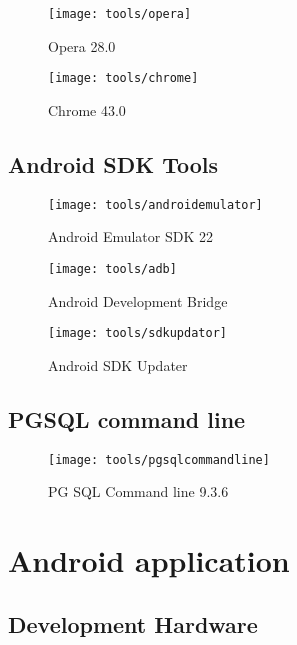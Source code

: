 \begin{figure}[p]
    \centering
    \texttt{[image: tools/opera]}
    \caption{Opera 28.0}
    \label{fig:opera_image}
\end{figure}

\begin{figure}[p]
    \centering
    \texttt{[image: tools/chrome]}
    \caption{Chrome 43.0}
    \label{fig:opera_image}
\end{figure}

\subsection*{Android SDK Tools}

\begin{figure}[p]
    \centering
    \texttt{[image: tools/androidemulator]}
    \caption{Android Emulator SDK 22}
    \label{fig:android_emulator}
\end{figure}

\begin{figure}[p]
    \centering
    \texttt{[image: tools/adb]}
    \caption{Android Development Bridge}
    \label{fig:adb_image}
\end{figure}

\begin{figure}[p]
    \centering
    \texttt{[image: tools/sdkupdator]}
    \caption{Android SDK Updater}
    \label{fig:sdk_updator}
\end{figure}


\subsection*{PGSQL command line}

\begin{figure}[p]
    \centering
    \texttt{[image: tools/pgsqlcommandline]}
    \caption{PG SQL Command line 9.3.6}
    \label{fig:pg_sql_image}
\end{figure}


\section{Android application}

\subsection{Development Hardware}

